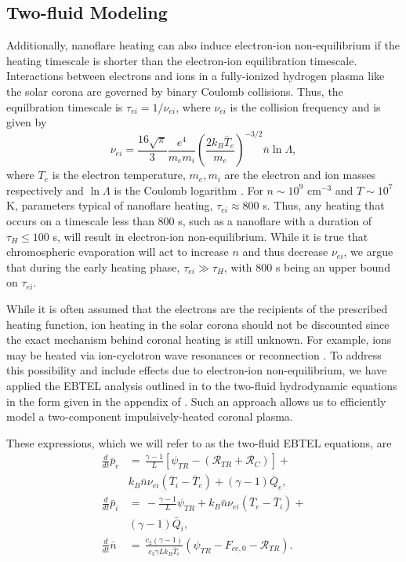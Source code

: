 \documentclass[apj]{emulateapj}
\begin{document}
	\subsection{Two-fluid Modeling}
	\label{subsec:two_fluid_theory}
	\par Additionally, nanoflare heating can also induce electron-ion non-equilibrium if the heating timescale is shorter than the electron-ion equilibration timescale. Interactions between electrons and ions in a fully-ionized hydrogen plasma like the solar corona are governed by binary Coulomb collisions. Thus, the equilbration timescale is $\tau_{ei}=1/\nu_{ei}$, where $\nu_{ei}$ is the collision frequency and is given by
	\begin{equation}
		\nu_{ei} = \frac{16\sqrt{\pi}}{3}\frac{e^4}{m_em_i}\left(\frac{2k_B\bar{T}_e}{m_e}\right)^{-3/2}\bar{n}\ln{\Lambda},
	\end{equation}
	where $T_e$ is the electron temperature, $m_e,m_i$ are the electron and ion masses respectively and $\ln{\Lambda}$ is the Coulomb logarithm \citep[see Eq. 2.5e and Section 3 of][]{braginskii_transport_1965}. For $n\sim10^9$ cm$^{-3}$ and $T\sim10^{7}$ K, parameters typical of nanoflare heating, $\tau_{ei}\approx800$ s. Thus, any heating that occurs on a timescale less than 800 s, such as a nanoflare with a duration of $\tau_H\le100$ s, will result in electron-ion non-equilibrium. While it is true that chromospheric evaporation will act to increase $n$ and thus decrease $\nu_{ei}$, we argue that during the early heating phase, $\tau_{ei}\gg\tau_H$, with 800 s being an upper bound on $\tau_{ei}$. 
	\par While it is often assumed that the electrons are the recipients of the prescribed heating function, ion heating in the solar corona should not be discounted since the exact mechanism behind coronal heating is still unknown. For example, ions may be heated via ion-cyclotron wave resonances \citep{markovskii_intermittent_2004} or reconnection \citep{ono_ion_1996,drake_onset_2014}. To address this possibility and include effects due to electron-ion non-equilibrium, we have applied the EBTEL analysis outlined in \citet{klimchuk_highly_2008} to the two-fluid hydrodynamic equations in the form given in the appendix of \citet{bradshaw_influence_2013}. Such an approach allows us to efficiently model a two-component impulsively-heated coronal plasma.
	\par These expressions, which we will refer to as the two-fluid EBTEL equations, are
	\begin{align}
		\frac{d}{dt}\bar{p}_e &=\,\frac{\gamma - 1}{L}[\psi_{TR} - (\mathcal{R}_{TR} + \mathcal{R}_C)] + \nonumber \\ & k_B\bar{n}\nu_{ei}(\bar{T}_i-\bar{T}_e) + (\gamma-1)\bar{Q}_{e},\label{eq:press_e_0d_2fl} \\[0.5em]
		\frac{d}{dt}\bar{p}_i &=\,-\frac{\gamma - 1}{L}\psi_{TR} + k_B\bar{n}\nu_{ei}(\bar{T}_e-\bar{T}_i) + \nonumber \\ &(\gamma-1)\bar{Q}_{i},\label{eq:press_i_0d_2fl} \\[0.5em]
		\frac{d}{dt}\bar{n} &=\,\frac{c_2(\gamma-1)}{c_3\gamma Lk_B\bar{T}_e}(\psi_{TR} - F_{ce,0}-\mathcal{R}_{TR}).	\label{eq:mass_0d_2fl}
	\end{align}
\end{document}
